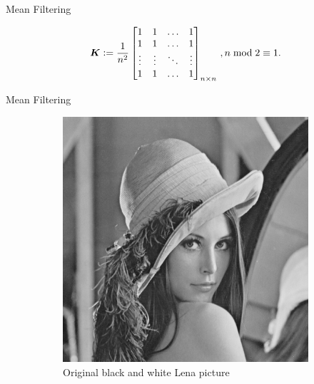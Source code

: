\documentclass[british, svgnames, dvipsnames]{upb-beamer}
\begin{document}
\begin{frame}{Mean Filtering}
    \begin{center}
    \Large
        \[
        \bm{K} \vcentcolon= \dfrac{1}{n^2}\begin{bmatrix}
                    1 & 1 &\dots  & 1\\
                    1 & 1 &\dots  & 1\\
                    \vdots & \vdots & \ddots & \vdots\\
                    1 & 1 &\dots  & 1
                 \end{bmatrix}_{n\times n}\,, n\bmod2\equiv1.
        \]
    \end{center}
\end{frame}

\begin{frame}{Mean Filtering}
    \begin{figure}[h!]
        \centering
        \captionsetup[subfigure]{justification=centering}
        \begin{subfigure}[b]{0.49\textwidth}
            \centering
            \includegraphics[width=\linewidth]{img/original.png}
            \caption{Original black and white Lena picture}
            \label{fig:original}
        \end{subfigure}
        \begin{subfigure}[b]{0.49\textwidth}

\end{subfigure}
\end{figure}
\end{frame}
\end{document}
